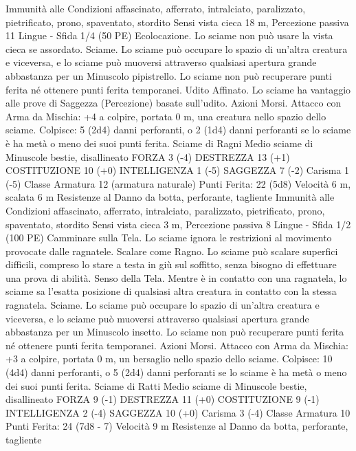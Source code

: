 \begin{multicols}{2}
Immunità alle Condizioni affascinato, afferrato, intralciato,
paralizzato, pietrificato, prono, spaventato, stordito
Sensi vista cieca 18 m, Percezione passiva 11
Lingue -
Sfida 1/4 (50 PE)
Ecolocazione. Lo sciame non può usare la vista cieca se
assordato.
Sciame. Lo sciame può occupare lo spazio di un’altra creatura e
viceversa, e lo sciame può muoversi attraverso qualsiasi apertura
grande abbastanza per un Minuscolo pipistrello. Lo sciame non
può recuperare punti ferita né ottenere punti ferita temporanei.
Udito Affinato. Lo sciame ha vantaggio alle prove di Saggezza
(Percezione) basate sull’udito.
Azioni
Morsi. Attacco con Arma da Mischia: +4 a colpire, portata 0 m,
una creatura nello spazio dello sciame.
Colpisce: 5 (2d4) danni perforanti, o 2 (1d4) danni perforanti se
lo sciame è ha metà o meno dei suoi punti ferita.
Sciame di Ragni
Medio sciame di Minuscole bestie, disallineato
FORZA 3 (-4)
DESTREZZA 13 (+1)
COSTITUZIONE 10 (+0)
INTELLIGENZA 1 (-5)
SAGGEZZA 7 (-2)
Carisma 1 (-5)
Classe Armatura 12 (armatura naturale)
\hspace*{0pt}\hfill{Punti Ferita}: 22 (5d8)
Velocità 6 m, scalata 6 m
Resistenze al Danno da botta, perforante, tagliente
Immunità alle Condizioni affascinato, afferrato, intralciato,
paralizzato, pietrificato, prono, spaventato, stordito
Sensi vista cieca 3 m, Percezione passiva 8
Lingue -
Sfida 1/2 (100 PE)
Camminare sulla Tela. Lo sciame ignora le restrizioni al
movimento provocate dalle ragnatele.
Scalare come Ragno. Lo sciame può scalare superfici difficili,
compreso lo stare a testa in giù sul soffitto, senza bisogno di
effettuare una prova di abilità.
Senso della Tela. Mentre è in contatto con una ragnatela, lo
sciame sa l’esatta posizione di qualsiasi altra creatura in contatto
con la stessa ragnatela.
Sciame. Lo sciame può occupare lo spazio di un’altra creatura e
viceversa, e lo sciame può muoversi attraverso qualsiasi apertura
grande abbastanza per un Minuscolo insetto. Lo sciame non può
recuperare punti ferita né ottenere punti ferita temporanei.
Azioni
Morsi. Attacco con Arma da Mischia: +3 a colpire, portata 0 m,
un bersaglio nello spazio dello sciame.
Colpisce: 10 (4d4) danni perforanti, o 5 (2d4) danni perforanti se
lo sciame è ha metà o meno dei suoi punti ferita.
Sciame di Ratti
Medio sciame di Minuscole bestie, disallineato
FORZA 9 (-1)
DESTREZZA 11 (+0)
COSTITUZIONE 9 (-1)
INTELLIGENZA 2 (-4)
SAGGEZZA 10 (+0)
Carisma 3 (-4)
Classe Armatura 10
\hspace*{0pt}\hfill{Punti Ferita}: 24 (7d8 - 7)
Velocità 9 m
Resistenze al Danno da botta, perforante, tagliente

\end{multicols}
